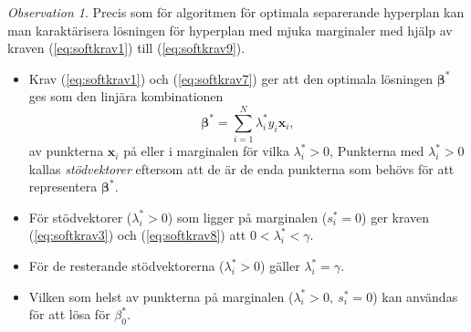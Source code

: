\documentclass[a4paper, 12pt]{report}
\theoremstyle{definition}
\theoremstyle{remark}
\newtheorem*{rem}{Observation}
\newcommand{\bfbeta}{{\boldsymbol{\beta}}}
\begin{document}
\begin{rem}
	Precis som för algoritmen för optimala separerande hyperplan kan man karaktärisera lösningen för hyperplan med mjuka marginaler med hjälp av kraven (\ref{eq:softkrav1}) till (\ref{eq:softkrav9}).
	\begin{itemize}
		\item Krav (\ref{eq:softkrav1}) och (\ref{eq:softkrav7}) ger att den optimala lösningen $\bfbeta^*$ ges som den linjära kombinationen
		\begin{equation*}
			\bfbeta^* = \sum_{i=1}^{N}\lambda_i^*y_i\mathbf{x}_i,
		\end{equation*}
		av punkterna $\mathbf{x}_i$ på eller i marginalen för vilka $\lambda_i^*>0$, Punkterna med $\lambda^*_i>0$ kallas \emph{stödvektorer} eftersom att de är de enda punkterna som behövs för att representera $\bfbeta^*$.
		\item För stödvektorer ($\lambda^*_i>0$) som ligger på marginalen ($s_i^*=0$) ger kraven (\ref{eq:softkrav3}) och (\ref{eq:softkrav8}) att $0<\lambda_i^*<\gamma$.
		\item För de resterande stödvektorerna ($\lambda_i^*>0$) gäller $\lambda_i^*=\gamma$.
		\item Vilken som helst av punkterna på marginalen ($\lambda^*_i>0,~s^*_i=0$) kan användas för att lösa för $\beta_0^*$.
	\end{itemize}
\end{rem}
\end{document}
